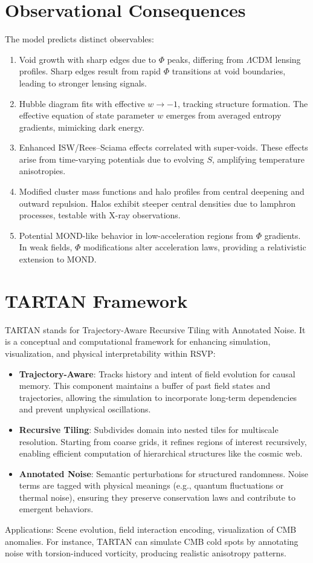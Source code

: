 \documentclass[11pt]{article}
\theoremstyle{plain}
\theoremstyle{definition}
\begin{document}
\section{Observational Consequences}
The model predicts distinct observables:
\begin{enumerate}
\item Void growth with sharp edges due to $\Phi$ peaks, differing from $\Lambda$CDM lensing profiles. Sharp edges result from rapid $\Phi$ transitions at void boundaries, leading to stronger lensing signals.
\item Hubble diagram fits with effective $w \to -1$, tracking structure formation. The effective equation of state parameter $w$ emerges from averaged entropy gradients, mimicking dark energy.
\item Enhanced ISW/Rees--Sciama effects correlated with super-voids. These effects arise from time-varying potentials due to evolving $S$, amplifying temperature anisotropies.
\item Modified cluster mass functions and halo profiles from central deepening and outward repulsion. Halos exhibit steeper central densities due to lamphron processes, testable with X-ray observations.
\item Potential MOND-like behavior in low-acceleration regions from $\Phi$ gradients. In weak fields, $\Phi$ modifications alter acceleration laws, providing a relativistic extension to MOND.
\end{enumerate}
\section{TARTAN Framework}
TARTAN stands for Trajectory-Aware Recursive Tiling with Annotated Noise. It is a conceptual and computational framework for enhancing simulation, visualization, and physical interpretability within RSVP:
\begin{itemize}
    \item \textbf{Trajectory-Aware}: Tracks history and intent of field evolution for causal memory. This component maintains a buffer of past field states and trajectories, allowing the simulation to incorporate long-term dependencies and prevent unphysical oscillations.
    \item \textbf{Recursive Tiling}: Subdivides domain into nested tiles for multiscale resolution. Starting from coarse grids, it refines regions of interest recursively, enabling efficient computation of hierarchical structures like the cosmic web.
    \item \textbf{Annotated Noise}: Semantic perturbations for structured randomness. Noise terms are tagged with physical meanings (e.g., quantum fluctuations or thermal noise), ensuring they preserve conservation laws and contribute to emergent behaviors.
\end{itemize}
Applications: Scene evolution, field interaction encoding, visualization of CMB anomalies. For instance, TARTAN can simulate CMB cold spots by annotating noise with torsion-induced vorticity, producing realistic anisotropy patterns.
\end{document}
